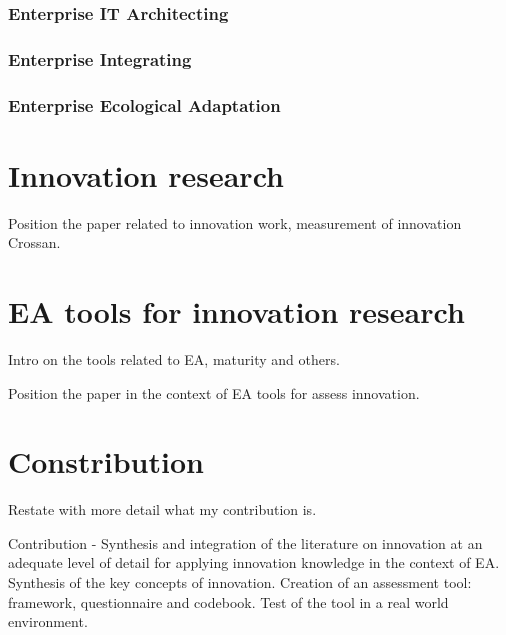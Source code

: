 \subsubsection*{Enterprise IT Architecting}

\subsubsection*{Enterprise Integrating}

\subsubsection*{Enterprise Ecological Adaptation}


\section{Innovation research}
Position the paper related to innovation work, measurement of innovation Crossan.

\section{EA tools for innovation research}
Intro on the tools related to EA, maturity and others.

Position the paper in the context of EA tools for assess innovation.


\section{Constribution}
Restate with more detail what my contribution is.

Contribution - Synthesis and integration of the literature on innovation at an adequate level of detail for applying innovation knowledge in the context of EA. 
Synthesis of the key concepts of innovation. 
Creation of an assessment tool: framework, questionnaire and codebook. 
Test of the tool in a real world environment.